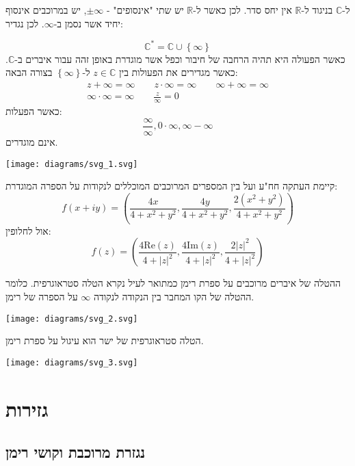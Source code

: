 \documentclass{tstextbook}
\begin{document}
ל-\(\mathbb{C}\) בניגוד ל-\(\mathbb{R}\) אין יחס סדר. לכן כאשר ל-\(\mathbb{R}\) יש שתי "אינסופים" - \(\pm\infty\), יש במרוכבים אינסוף יחיד אשר נסמן ב-\(\infty\). לכן נגדיר:

\begin{definition}
$$\mathbb{C}^*=\mathbb{C}\cup \left\{  \infty  \right\}$$
כאשר הפעולה היא תהיה הרחבה של חיבור וכפל אשר מוגדרת באופן זהה עבור איברים ב-\(\mathbb{C}\). כאשר מגדירים את הפעולות בין \(z\in \mathbb{C}\) ל-\(\left\{  \infty   \right\}\) בצורה הבאה:
$$\begin{gather}z+\infty=\infty \qquad z\cdot \infty=\infty \qquad \infty+\infty=\infty \\\infty\cdot \infty=\infty \qquad \frac{z}{\infty}=0 
\end{gather}$$
כאשר הפעלות:
$$\frac{\infty}{\infty},0\cdot \infty,\infty-\infty$$
אינם מוגדרים.

\end{definition}
\texttt{[image: diagrams/svg\_1.svg]}
\begin{proposition}
קיימת העתקה חח"ע ועל בין המספרים המרוכבים המוכללים לנקודות על הספרה המוגדרת:
$$f(x+iy)=\left( \frac{4x}{4+x^2+y^2},\frac{4y}{4+x^2+y^2},\frac{2(x^2+y^2)}{4+x^2+y^2} \right)$$
אול לחלופין:
$$f(z)=\left( \frac{4\mathrm{Re}(z)}{4+\lvert z \rvert ^2},\frac{4\mathrm{Im}(z)}{4+\lvert z \rvert ^2},\frac{2\lvert z \rvert ^2}{4+\lvert z \rvert ^2} \right)$$

\end{proposition}
\begin{definition}
ההטלה של איברים מרוכבים על ספרת רימן כמתואר לעיל נקרא הטלה סטראוגרפית. כלומר ההטלה של הקו המחבר בין הנקודה לנקודה \(\infty\) על הספרה של רימן.

\end{definition}
\texttt{[image: diagrams/svg\_2.svg]}
\begin{proposition}
הטלה סטראוגרפית של ישר הוא עיגול על ספרת רימן.

\texttt{[image: diagrams/svg\_3.svg]}
\end{proposition}
\section{גזירות}

\subsection{נגזרת מרוכבת וקושי רימן}
\end{document}
